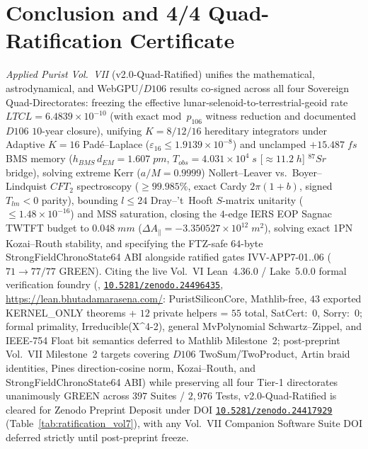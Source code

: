 \documentclass[11pt,a4paper,reqno]{article}
\def\texttt#1{#1}%
\def\mathrm#1{#1}%
\def\mathcal#1{#1}%
\def\mathbb#1{#1}%
\def\Done{D106}%
\def\LTCL{LTCL}%
\theoremstyle{plain}
\theoremstyle{definition}
\theoremstyle{remark}
\numberwithin{equation}{section}
\numberwithin{table}{section}
\newcommand{\Done}{\mathbb{D}_{106}}
\newcommand{\LTCL}{L_{\mathrm{TCL}}}
\providecommand{\zenodo}[1]{\href{https://doi.org/10.5281/zenodo.#1}{\nolinkurl{10.5281/zenodo.#1}}}
\begin{document}
\section{Conclusion and 4/4 Quad-Ratification Certificate}
\label{sec:conclusion}

\emph{Applied Purist Vol.~VII} (\texttt{v2.0-Quad-Ratified}) unifies the mathematical, astrodynamical, and WebGPU/$\Done$ results co-signed across all four Sovereign Quad-Directorates: freezing the effective lunar-selenoid-to-terrestrial-geoid rate $\LTCL = 6.4839 \times 10^{-10}$ (with exact \texttt{mod}~$p_{106}$ witness reduction and documented $\Done$ $10$-year closure), unifying $K=8/12/16$ hereditary integrators under Adaptive $K=16$ Pad\'e--Laplace ($\varepsilon_{16} \le 1.9139 \times 10^{-8}$) and unclamped $+15.487\;\mathrm{fs}$ BMS memory ($h_{\mathrm{BMS}}\,d_{\mathrm{EM}} = 1.607\;\mathrm{pm}$, $T_{\mathrm{obs}}=4.031\times 10^4\;\mathrm{s}$ [$\approx 11.2\;\mathrm{h}$] $^{87}\mathrm{Sr}$ bridge), solving extreme Kerr ($a/M = 0.9999$) Nollert--Leaver vs.\ Boyer--Lindquist $\mathrm{CFT}_2$ spectroscopy ($\ge 99.985\%$, exact Cardy $2\pi(1+b)$, signed $\mathcal{T}_{lm}<0$ parity), bounding $l \le 24$ Dray--'t~Hooft $S$-matrix unitarity ($\le 1.48\times 10^{-16}$) and MSS saturation, closing the $4$-edge IERS EOP Sagnac TWTFT budget to $0.048\;\mathrm{mm}$ ($\Delta A_\parallel = -3.350527\times 10^{12}\;\mathrm{m}^2$), solving exact 1PN Kozai--Routh stability, and specifying the FTZ-safe $64$-byte \texttt{StrongFieldChronoState64} ABI alongside ratified gates \texttt{IVV-APP7-01..06} ($71 \to 77/77$ GREEN). Citing the live Vol.~VI Lean~4.36.0 / Lake~5.0.0 formal verification foundry (\cite{AppliedPuristVol6Lean2026}, \zenodo{24496435}, \url{https://lean.bhutadamarasena.com/}: \texttt{PuristSiliconCore}, Mathlib-free, $43$ exported \texttt{KERNEL\_ONLY} theorems + $12$ private helpers = $55$ total, \texttt{SatCert:~0}, \texttt{Sorry:~0}; formal primality, \texttt{Irreducible(X\^{}4-2)}, general \texttt{MvPolynomial} Schwartz--Zippel, and IEEE-754 \texttt{Float} bit semantics deferred to Mathlib Milestone~2; post-preprint Vol.~VII Milestone~2 targets covering $\Done$ \texttt{TwoSum}/\texttt{TwoProduct}, Artin braid identities, Pines direction-cosine norm, Kozai--Routh, and \texttt{StrongFieldChronoState64} ABI) while preserving all four Tier-1 directorates unanimously GREEN across $397$ Suites / $2{,}976$ Tests, \texttt{v2.0-Quad-Ratified} is cleared for Zenodo Preprint Deposit under DOI \zenodo{24417929} (Table~\ref{tab:ratification_vol7}), with any Vol.~VII Companion Software Suite DOI deferred strictly until post-preprint freeze.
\end{document}
